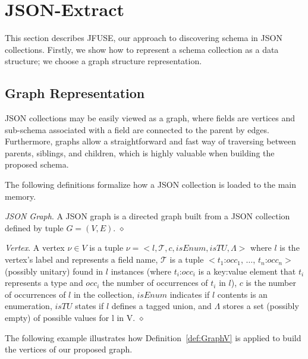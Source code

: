 \section{JSON-Extract}
\label{sec:SchDisc}

This section describes JFUSE, our approach to discovering schema in JSON collections. Firstly, we show how to represent a schema collection as a data structure; we choose a graph structure representation. 

\subsection{Graph Representation}
\label{subsec:graph}

JSON collections may be easily viewed as a graph, where fields are vertices and sub-schema associated with a field are connected to the parent by edges. Furthermore, graphs allow a straightforward and fast way of traversing between parents, siblings, and children, which is highly valuable when building the proposed schema. 

The following definitions formalize how a JSON collection is loaded to the main memory.

\begin{definition} {\it JSON Graph}.
   A JSON graph is a directed graph built from a JSON collection defined by tuple \(G=(V, E)\). 
   \hfill{$\diamond$}
   \label{def:Graph}
\end{definition}

\begin{definition} {\it Vertex}. 
   A vertex \(\nu \in V\) is a tuple \(\nu\)\(=<l, \mathcal{T}, c, isEnum, isTU, \Lambda\)\(>\) where $l$ is the vertex's label and represents a field name, $\mathcal{T}$ is a tuple \(<\)\(t_1\):\(occ_1\), \(\ldots\), \(t_n\):\(occ_n\)$>$ (possibly unitary)  found in $l$ instances (where $t_i$:$occ_i$ is a key:value element that $t_i$ represents a type and $occ_i$ the number of occurrences of $t_i$ in $l$), $c$ is the number of occurrences of $l$ in the collection, \(isEnum\) indicates if \(l\) contents is an enumeration, \(isTU\) states if \(l\) defines a tagged union, and \(\Lambda\) stores a set (possibly empty) of possible values for l in V. 
   \hfill{$\diamond$}
   \label{def:GraphV}
\end{definition}

The following example illustrates how Definition~\ref{def:GraphV} is applied to build the vertices of our proposed graph.

